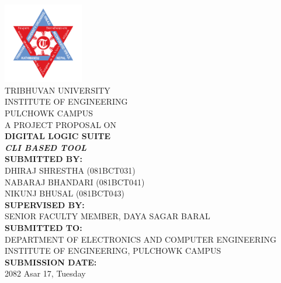 \begin{titlepage}
    \begin{center}
        \includegraphics[width=3.5cm]{images/tuLogo.png} \\[0.8cm]

        {\large {TRIBHUVAN UNIVERSITY}} \\[0.2cm]
        {\normalsize {INSTITUTE OF ENGINEERING}} \\[0.2cm]
        {\normalsize {PULCHOWK CAMPUS}} \\[1cm]

        {\large {A PROJECT PROPOSAL ON}} \\[0.4cm]
        {\large \textbf{DIGITAL LOGIC SUITE}} \\[0.2cm]
        {\normalsize \textit{\textbf{CLI BASED TOOL}}} \\[1cm]

        {\normalsize \textbf{SUBMITTED BY:}} \\[0.2cm]
        {\normalsize DHIRAJ SHRESTHA (081BCT031)} \\[0.1cm]
        {\normalsize NABARAJ BHANDARI (081BCT041)} \\[0.1cm]
        {\normalsize NIKUNJ BHUSAL (081BCT043)} \\[0.8cm]

        {\normalsize \textbf{SUPERVISED BY:}} \\[0.2cm]
        {\normalsize SENIOR FACULTY MEMBER, DAYA SAGAR BARAL} \\[0.8cm]

        {\normalsize \textbf{SUBMITTED TO:}} \\[0.2cm]
        {\normalsize DEPARTMENT OF ELECTRONICS AND COMPUTER ENGINEERING} \\[0.2cm]
        {\normalsize INSTITUTE OF ENGINEERING, PULCHOWK CAMPUS} \\[1cm]

        {\normalsize \textbf{SUBMISSION DATE:}} \\[0.2cm]
        {\normalsize 2082 Asar 17, Tuesday}
    \end{center}
\end{titlepage}